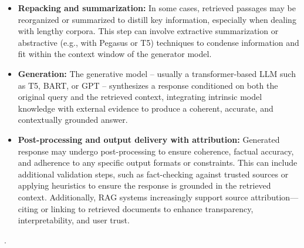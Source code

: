 \begin{spacing}{1.5}
\begin{itemize}
    \item \textbf{Repacking and summarization:} In some cases, retrieved passages may be reorganized or summarized to distill key information, especially when dealing with lengthy corpora. This step can involve extractive summarization or abstractive (e.g., with Pegasus or T5) techniques to condense information and fit within the context window of the generator model.
    \item \textbf{Generation:} The generative model -- usually a transformer-based LLM such as T5, BART, or GPT -- synthesizes a response conditioned on both the original query and the retrieved context, integrating intrinsic model knowledge with external evidence to produce a coherent, accurate, and contextually grounded answer.
    \item \textbf{Post-processing and output delivery with attribution:} Generated response may undergo post-processing to ensure coherence, factual accuracy, and adherence to any specific output formats or constraints. This can include additional validation steps, such as fact-checking against trusted sources or applying heuristics to ensure the response is grounded in the retrieved context. Additionally, RAG systems increasingly support source attribution—citing or linking to retrieved documents to enhance transparency, interpretability, and user trust.
\end{itemize}
\citep{vaibhav_retrieval-augmented_2025,wang_searching_2024,gupta_comprehensive_2024}.



\end{spacing}
